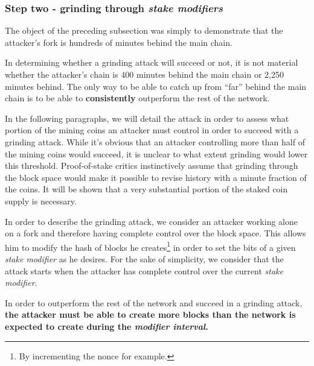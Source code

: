 \documentclass[a4paper,11pt]{article}
\begin{document}
\subsubsection*{Step two - grinding through \textit{stake modifiers}}

The object of the preceding subsection was simply to demonstrate that the attacker's fork is hundreds of minutes behind the main chain. 

In determining whether a grinding attack will succeed or not, it is not material whether the attacker's chain is 400 minutes behind the main chain or 2,250 minutes behind. The only way to be able to catch up from ``far'' behind the main chain is to be able to \textbf{consistently} outperform the rest of the network. 

In the following paragraphs, we will detail the attack in order to assess what portion of the mining coins an attacker must control in order to succeed with a grinding attack. While it's obvious that an attacker controlling more than half of the mining coins would succeed, it is unclear to what extent grinding would lower this threshold. Proof-of-stake critics instinctively assume that grinding through the block space would make it possible to revise history with a minute fraction of the coins. It will be shown that a very substantial portion of the staked coin supply is necessary. 

In order to describe the grinding attack, we consider an attacker working alone on a fork and therefore having complete control over the block space. This allows him to modify the hash of blocks he creates\footnote{By incrementing the nonce for example.} in order to set the bits of a given \textit{stake modifier} as he desires.
For the sake of simplicity, we consider that the attack starts when the attacker has complete control over the current \textit{stake modifier}. 

In order to outperform the rest of the network and succeed in a grinding attack, \textbf{the attacker must be able to create more blocks than the network is expected to create during the \textit{modifier interval}.}
\end{document}

